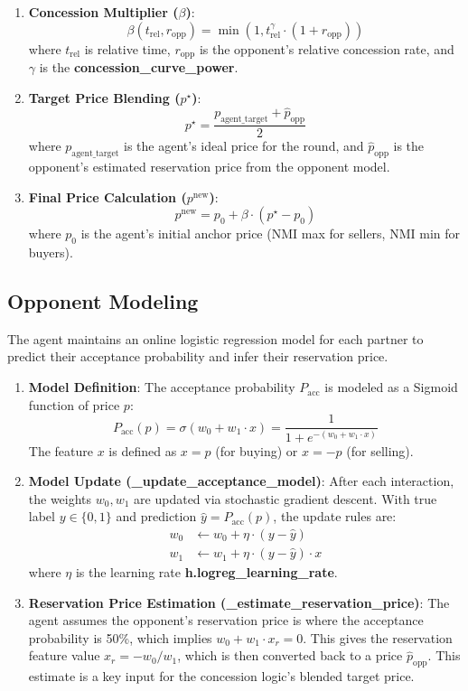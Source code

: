\documentclass[12pt, a4paper]{article}
\begin{document}
\begin{enumerate}
\item \textbf{Concession Multiplier ($\beta$)}:
$$
\beta(t_{\text{rel}}, r_{\text{opp}}) = \min\left(1, t_{\text{rel}}^{\gamma} \cdot (1 + r_{\text{opp}})\right)
$$
where $t_{\text{rel}}$ is relative time, $r_{\text{opp}}$ is the opponent's relative concession rate, and $\gamma$ is the\textbf{ concession\_curve\_power}.

\item \textbf{Target Price Blending ($p^{\star}$)}: 
$$
p^{\star} = \frac{p_{\text{agent\_target}} + \hat{p}_{\text{opp}}}{2}
$$
where $p_{\text{agent\_target}}$ is the agent's ideal price for the round, and $\hat{p}_{\text{opp}}$ is the opponent's estimated reservation price from the opponent model.

\item \textbf{Final Price Calculation ($p^{\text{new}}$)}:
$$
p^{\text{new}} = p_0 + \beta \cdot (p^{\star} - p_0)
$$
where $p_0$ is the agent's initial anchor price (NMI max for sellers, NMI min for buyers).
\end{enumerate}

\subsection{Opponent Modeling}
The agent maintains an online logistic regression model for each partner to predict their acceptance probability and infer their reservation price.

\begin{enumerate}
\item \textbf{Model Definition}: The acceptance probability $P_{\text{acc}}$ is modeled as a Sigmoid function of price $p$:
$$
P_{\text{acc}}(p) = \sigma(w_0 + w_1 \cdot x) = \frac{1}{1 + e^{-(w_0 + w_1 \cdot x)}}
$$
The feature $x$ is defined as $x = p$ (for buying) or $x = -p$ (for selling).

\item \textbf{Model Update \textbf{(\_update\_acceptance\_model)}}: After each interaction, the weights $w_0, w_1$ are updated via stochastic gradient descent. With true label $y \in \{0, 1\}$ and prediction $\hat{y} = P_{\text{acc}}(p)$, the update rules are:
$$
\begin{align*}
w_0 & \leftarrow w_0 + \eta \cdot (y - \hat{y}) \\
w_1 & \leftarrow w_1 + \eta \cdot (y - \hat{y}) \cdot x
\end{align*}
$$
where $\eta$ is the learning rate \textbf{h.logreg\_learning\_rate}.

\item \textbf{Reservation Price Estimation (\textbf{\_estimate\_reservation\_price})}: The agent assumes the opponent's reservation price is where the acceptance probability is 50\%, which implies $w_0 + w_1 \cdot x_r = 0$. This gives the reservation feature value $x_r = -w_0 / w_1$, which is then converted back to a price $\hat{p}_{\text{opp}}$. This estimate is a key input for the concession logic's blended target price.
\end{enumerate}
\end{document}
